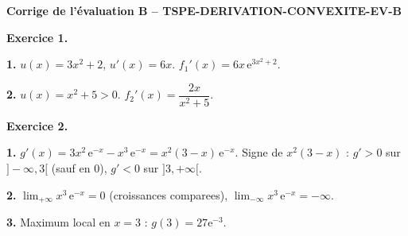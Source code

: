 %
%
%
%
% 

\textbf{Corrige de l'évaluation B -- TSPE-DERIVATION-CONVEXITE-EV-B}

\textbf{Exercice 1.}

\textbf{1.} $u(x) = 3x^2 + 2$, $u'(x) = 6x$. $f_1'(x) = 6x\,\mathrm{e}^{3x^2+2}$.

\textbf{2.} $u(x) = x^2 + 5 > 0$. $f_2'(x) = \dfrac{2x}{x^2 + 5}$.

\bigskip

\textbf{Exercice 2.}

\textbf{1.} $g'(x) = 3x^2\,\mathrm{e}^{-x} - x^3\,\mathrm{e}^{-x} = x^2(3-x)\,\mathrm{e}^{-x}$. Signe de $x^2(3-x)$ : $g' > 0$ sur $]-\infty, 3[$ (sauf en 0), $g' < 0$ sur $]3, +\infty[$.

\textbf{2.} $\lim_{+\infty} x^3\,\mathrm{e}^{-x} = 0$ (croissances comparees), $\lim_{-\infty} x^3\,\mathrm{e}^{-x} = -\infty$.

\textbf{3.} Maximum local en $x = 3$ : $g(3) = 27\mathrm{e}^{-3}$.

